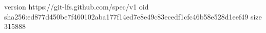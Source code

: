 version https://git-lfs.github.com/spec/v1
oid sha256:ed877d450be7f460102aba177f14ed7e8e49c83ecedf1cfc46b58e528d1eef49
size 315888

